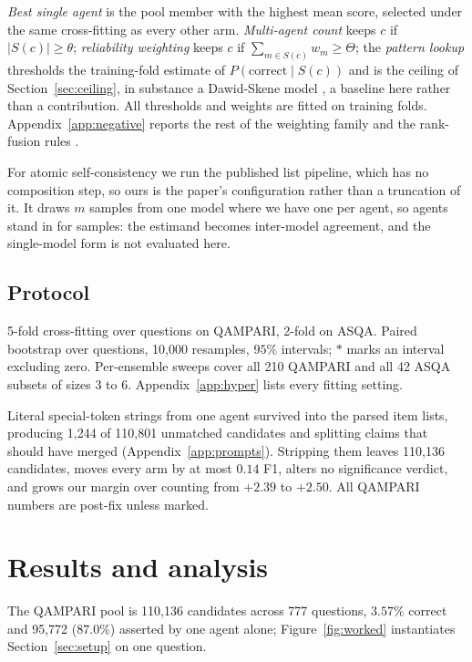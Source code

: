 \documentclass{article}
\begin{document}
\emph{Best single agent} is the pool member with the highest mean score, selected under the same cross-fitting as every other arm. \emph{Multi-agent count} keeps $c$ if $|S(c)| \geq \theta$; \emph{reliability weighting} keeps $c$ if $\sum_{m \in S(c)} w_m \geq \Theta$; the \emph{pattern lookup} thresholds the training-fold estimate of $P(\mathrm{correct} \mid S(c))$ and is the ceiling of Section~\ref{sec:ceiling}, in substance a Dawid-Skene model \cite{dawid1979maximum}, a baseline here rather than a contribution. All thresholds and weights are fitted on training folds. Appendix~\ref{app:negative} reports the rest of the weighting family and the rank-fusion rules \cite{cormack2009reciprocal}.

For atomic self-consistency \cite{thirukovalluru2024atomic} we run the published list pipeline, which has no composition step, so ours is the paper's configuration rather than a truncation of it. It draws $m$ samples from one model where we have one per agent, so agents stand in for samples: the estimand becomes inter-model agreement, and the single-model form is not evaluated here.

\subsection{Protocol}
\label{sec:protocol}
\label{sec:crossfit}

5-fold cross-fitting over questions on QAMPARI, 2-fold on ASQA. Paired bootstrap over questions, 10,000 resamples, $95\%$ intervals; $*$ marks an interval excluding zero. Per-ensemble sweeps cover all 210 QAMPARI and all 42 ASQA subsets of sizes 3 to 6. Appendix~\ref{app:hyper} lists every fitting setting.

Literal special-token strings from one agent survived into the parsed item lists, producing 1,244 of 110,801 unmatched candidates and splitting claims that should have merged (Appendix~\ref{app:prompts}). Stripping them leaves 110,136 candidates, moves every arm by at most $0.14$ F1, alters no significance verdict, and grows our margin over counting from $+2.39$ to $+2.50$. All QAMPARI numbers are post-fix unless marked.


\section{Results and analysis}
\label{sec:results}

The QAMPARI pool is 110,136 candidates across 777 questions, $3.57\%$ correct and 95,772 ($87.0\%$) asserted by one agent alone; Figure~\ref{fig:worked} instantiates Section~\ref{sec:setup} on one question.
\end{document}
